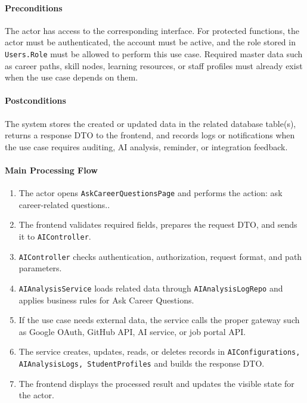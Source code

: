 \paragraph{Preconditions}

The actor has access to the corresponding interface. For protected functions, the actor must be authenticated, the account must be active, and the role stored in \texttt{Users.Role} must be allowed to perform this use case. Required master data such as career paths, skill nodes, learning resources, or staff profiles must already exist when the use case depends on them.

\paragraph{Postconditions}

The system stores the created or updated data in the related database table(s), returns a response DTO to the frontend, and records logs or notifications when the use case requires auditing, AI analysis, reminder, or integration feedback.

\paragraph{Main Processing Flow}

\begin{enumerate}
    \item The actor opens \texttt{AskCareerQuestionsPage} and performs the action: ask career-related questions..
    \item The frontend validates required fields, prepares the request DTO, and sends it to \texttt{AIController}.
    \item \texttt{AIController} checks authentication, authorization, request format, and path parameters.
    \item \texttt{AIAnalysisService} loads related data through \texttt{AIAnalysisLogRepo} and applies business rules for Ask Career Questions.
    \item If the use case needs external data, the service calls the proper gateway such as Google OAuth, GitHub API, AI service, or job portal API.
    \item The service creates, updates, reads, or deletes records in \texttt{AIConfigurations, AIAnalysisLogs, StudentProfiles} and builds the response DTO.
    \item The frontend displays the processed result and updates the visible state for the actor.
\end{enumerate}

